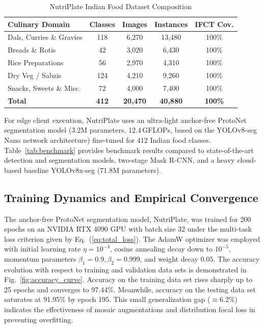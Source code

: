 \documentclass[conference]{IEEEtran}
\begin{document}
\begin{table}[!htbp]
\centering
\caption{NutriPlate Indian Food Dataset Composition}
\label{tab:dataset}
\setlength{\tabcolsep}{4.2pt}
\renewcommand{\arraystretch}{1.12}
\begin{tabular}{@{}lcccc@{}}
\toprule
\textbf{Culinary Domain} & \textbf{Classes} & \textbf{Images} & \textbf{Instances} & \textbf{IFCT Cov.} \\ \midrule
Dals, Curries \& Gravies & 118 & 6,270 & 13,480 & 100\% \\
Breads \& Rotis & 42 & 3,020 & 6,430 & 100\% \\
Rice Preparations & 56 & 2,970 & 4,310 & 100\% \\
Dry Veg / Sabzis & 124 & 4,210 & 9,260 & 100\% \\
Snacks, Sweets \& Misc. & 72 & 4,000 & 7,400 & 100\% \\ \midrule
\textbf{Total} & \textbf{412} & \textbf{20,470} & \textbf{40,880} & \textbf{100\%} \\ \bottomrule
\end{tabular}
\end{table}

For edge client execution, NutriPlate uses an ultra-light anchor-free ProtoNet segmentation model (3.2M parameters, 12.4\,GFLOPs, based on the YOLOv8-seg Nano network architecture) fine-tuned for 412 Indian food classes. Table~\ref{tab:benchmark} provides benchmark results compared to state-of-the-art detection and segmentation models, two-stage Mask R-CNN, and a heavy cloud-based baseline YOLOv8x-seg (71.8M parameters).

\subsection{Training Dynamics and Empirical Convergence}
The anchor-free ProtoNet segmentation model, NutriPlate, was trained for 200 epochs on an NVIDIA RTX 4090 GPU with batch size 32 under the multi-task loss criterion given by Eq.~(\ref{eq:total_loss}). The AdamW optimizer \cite{loshchilov2018decoupled} was employed with initial learning rate $\eta = 10^{-3}$, cosine annealing decay down to $10^{-5}$, momentum parameters $\beta_1 = 0.9, \beta_2 = 0.999$, and weight decay $0.05$. The accuracy evolution with respect to training and validation data sets is demonstrated in Fig.~\ref{fig:accuracy_curve}. Accuracy on the training data set rises sharply up to 25 epochs and converges to 97.44\%. Meanwhile, accuracy on the testing data set saturates at 91.95\% by epoch 195. This small generalization gap ($\approx 6.2\%$) indicates the effectiveness of mosaic augmentations and distribution focal loss in preventing overfitting.
\end{document}
